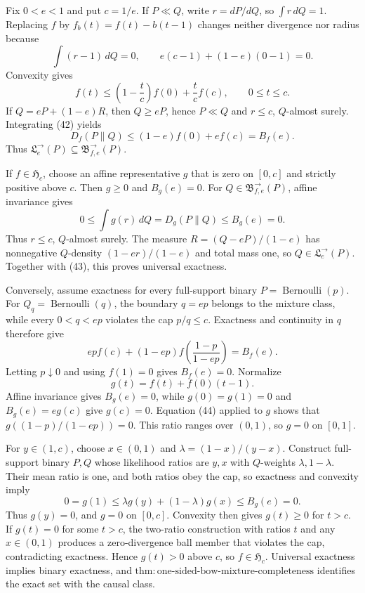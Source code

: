 Fix \(0<e<1\) and put \(c=1/e\).  If \(P\ll Q\), write \(r=dP/dQ\), so \(\int r\,dQ=1\).  Replacing \(f\) by \(f_b(t)=f(t)-b(t-1)\) changes neither divergence nor radius because
\[
 \int(r-1)\,dQ=0,
 \qquad
 e(c-1)+(1-e)(0-1)=0. \tag{41}
\]
Convexity gives
\[
 f(t)\le\left(1-\frac tc\right)f(0)+\frac tc f(c),
 \qquad 0\le t\le c. \tag{42}
\]
If \(Q=eP+(1-e)R\), then \(Q\ge eP\), hence \(P\ll Q\) and \(r\le c\), \(Q\)-almost surely.  Integrating (42) yields
\[
 D_f(P\|Q)\le(1-e)f(0)+ef(c)=B_f(e). \tag{43}
\]
Thus \(\mathfrak L^{\to}_e(P)\subseteq\mathfrak B^{\to}_{f,e}(P)\).

If \(f\in\mathfrak H_c\), choose an affine representative \(g\) that is zero on \([0,c]\) and strictly positive above \(c\).  Then \(g\ge0\) and \(B_g(e)=0\).  For \(Q\in\mathfrak B^{\to}_{f,e}(P)\), affine invariance gives
\[
 0\le\int g(r)\,dQ=D_g(P\|Q)\le B_g(e)=0.
\]
Thus \(r\le c\), \(Q\)-almost surely.  The measure \(R=(Q-eP)/(1-e)\) has nonnegative \(Q\)-density \((1-er)/(1-e)\) and total mass one, so \(Q\in\mathfrak L^{\to}_e(P)\).  Together with (43), this proves universal exactness.

Conversely, assume exactness for every full-support binary \(P=\operatorname{Bernoulli}(p)\).  For \(Q_q=\operatorname{Bernoulli}(q)\), the boundary \(q=ep\) belongs to the mixture class, while every \(0<q<ep\) violates the cap \(p/q\le c\).  Exactness and continuity in \(q\) therefore give
\[
 epf(c)+(1-ep)f\!\left(\frac{1-p}{1-ep}\right)=B_f(e). \tag{44}
\]
Letting \(p\downarrow0\) and using \(f(1)=0\) gives \(B_f(e)=0\).  Normalize
\[
 g(t)=f(t)+f(0)(t-1).
\]
Affine invariance gives \(B_g(e)=0\), while \(g(0)=g(1)=0\) and \(B_g(e)=eg(c)\) give \(g(c)=0\).  Equation (44) applied to \(g\) shows that \(g((1-p)/(1-ep))=0\).  This ratio ranges over \((0,1)\), so \(g=0\) on \([0,1]\).

For \(y\in(1,c)\), choose \(x\in(0,1)\) and \(\lambda=(1-x)/(y-x)\).  Construct full-support binary \(P,Q\) whose likelihood ratios are \(y,x\) with \(Q\)-weights \(\lambda,1-\lambda\).  Their mean ratio is one, and both ratios obey the cap, so exactness and convexity imply
\[
 0=g(1)\le\lambda g(y)+(1-\lambda)g(x)\le B_g(e)=0.
\]
Thus \(g(y)=0\), and \(g=0\) on \([0,c]\).  Convexity then gives \(g(t)\ge0\) for \(t>c\).  If \(g(t)=0\) for some \(t>c\), the two-ratio construction with ratios \(t\) and any \(x\in(0,1)\) produces a zero-divergence ball member that violates the cap, contradicting exactness.  Hence \(g(t)>0\) above \(c\), so \(f\in\mathfrak H_c\).  Universal exactness implies binary exactness, and \(\mathrm{thm:one\text{-}sided\text{-}bow\text{-}mixture\text{-}completeness}\) identifies the exact set with the causal class.